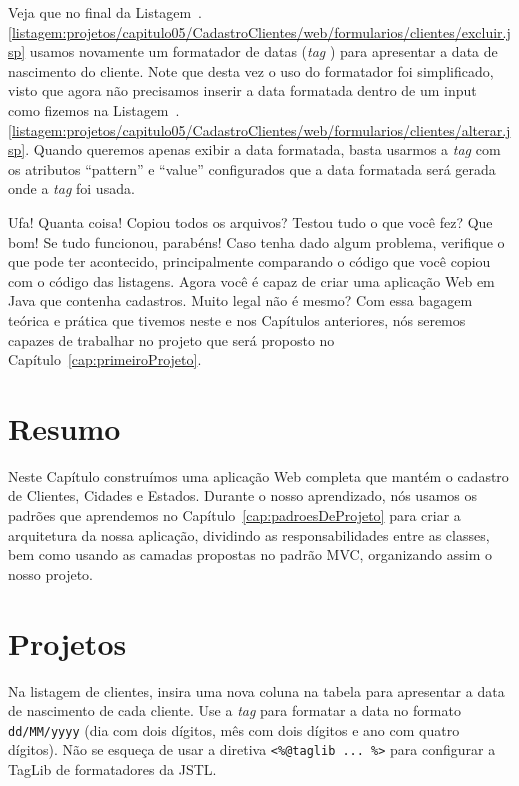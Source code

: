 
Veja que no final da Listagem~\thechapter.\ref{listagem:projetos/capitulo05/CadastroClientes/web/formularios/clientes/excluir.jsp} usamos novamente um formatador de datas (\textit{tag} ) para apresentar a data de nascimento do cliente. Note que desta vez o uso do formatador foi simplificado, visto que agora não precisamos inserir a data formatada dentro de um input como fizemos na Listagem~\thechapter.\ref{listagem:projetos/capitulo05/CadastroClientes/web/formularios/clientes/alterar.jsp}. Quando queremos apenas exibir a data formatada, basta usarmos a \textit{tag}  com os atributos ``pattern'' e ``value'' configurados que a data formatada será gerada onde a \textit{tag} foi usada.

Ufa! Quanta coisa! Copiou todos os arquivos? Testou tudo o que você fez? Que bom! Se tudo funcionou, parabéns! Caso tenha dado algum problema, verifique o que pode ter acontecido, principalmente comparando o código que você copiou com o código das listagens. Agora você é capaz de criar uma aplicação Web em Java que contenha cadastros. Muito legal não é mesmo? Com essa bagagem teórica e prática que tivemos neste e nos Capítulos anteriores, nós seremos capazes de trabalhar no projeto que será proposto no Capítulo~\ref{cap:primeiroProjeto}.

\section{Resumo}

Neste Capítulo construímos uma aplicação Web completa que mantém o cadastro de Clientes, Cidades e Estados. Durante o nosso aprendizado, nós usamos os padrões que aprendemos no Capítulo~\ref{cap:padroesDeProjeto} para criar a arquitetura da nossa aplicação, dividindo as responsabilidades entre as classes, bem como usando as camadas propostas no padrão MVC, organizando assim o nosso projeto. 


\section{Projetos}

\begin{projetoSemArquivo}{}{}{}
    Na listagem de clientes, insira uma nova coluna na tabela para apresentar a data de nascimento de cada cliente. Use a \textit{tag}  para formatar a data no formato \texttt{dd/MM/yyyy} (dia com dois dígitos, mês com dois dígitos e ano com quatro dígitos). Não se esqueça de usar a diretiva \texttt{<\%@taglib ... \%>} para configurar a TagLib de formatadores da JSTL. 
\end{projetoSemArquivo}


